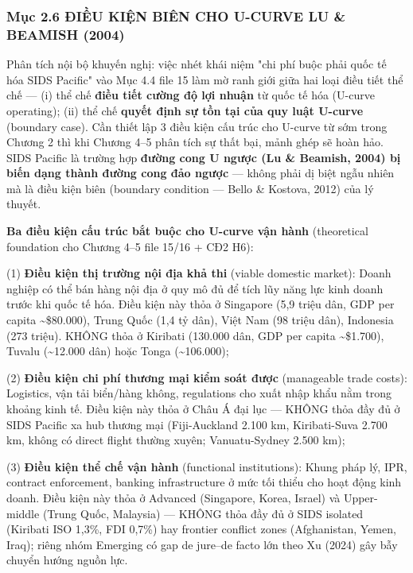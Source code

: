 \documentclass[12pt,a4paper]{article}
\begin{document}
\hypertarget{mux1ee5c-26-ux111iux1ec1u-kiux1ec7n-biuxean-cho-u-curve-lu--beamish-2004}{%
\subsubsection{Mục 2.6 ĐIỀU KIỆN BIÊN CHO U-CURVE LU \& BEAMISH
(2004)}\label{mux1ee5c-26-ux111iux1ec1u-kiux1ec7n-biuxean-cho-u-curve-lu--beamish-2004}}

Phân tích nội bộ khuyến nghị: việc nhét khái niệm "chi phí buộc phải
quốc tế hóa SIDS Pacific" vào Mục 4.4 file 15 làm mờ ranh giới giữa hai
loại điều tiết thể chế --- (i) thể chế \textbf{điều tiết cường độ lợi
nhuận} từ quốc tế hóa (U-curve operating); (ii) thể chế \textbf{quyết
định sự tồn tại của quy luật U-curve} (boundary case). Cần thiết lập 3
điều kiện cấu trúc cho U-curve từ sớm trong Chương 2 thì khi Chương 4--5
phân tích sự thất bại, mảnh ghép sẽ hoàn hảo. SIDS Pacific là trường hợp
\textbf{đường cong U ngược (Lu \& Beamish, 2004) bị biến dạng thành
đường cong đảo ngược} --- không phải dị biệt ngẫu nhiên mà là điều kiện
biên (boundary condition --- Bello \& Kostova, 2012) của lý thuyết.

\textbf{Ba điều kiện cấu trúc bắt buộc cho U-curve vận hành}
(theoretical foundation cho Chương 4--5 file 15/16 + CĐ2 H6):

(1) \textbf{Điều kiện thị trường nội địa khả thi} (viable domestic
market): Doanh nghiệp có thể bán hàng nội địa ở quy mô đủ để tích lũy
năng lực kinh doanh trước khi quốc tế hóa. Điều kiện này thỏa ở
Singapore (5,9 triệu dân, GDP per capita \textasciitilde\$80.000), Trung
Quốc (1,4 tỷ dân), Việt Nam (98 triệu dân), Indonesia (273 triệu). KHÔNG
thỏa ở Kiribati (130.000 dân, GDP per capita \textasciitilde\$1.700),
Tuvalu (\textasciitilde12.000 dân) hoặc Tonga (\textasciitilde106.000);

(2) \textbf{Điều kiện chi phí thương mại kiểm soát được} (manageable
trade costs): Logistics, vận tải biển/hàng không, regulations cho xuất
nhập khẩu nằm trong khoảng kinh tế. Điều kiện này thỏa ở Châu Á đại lục
--- KHÔNG thỏa đầy đủ ở SIDS Pacific xa hub thương mại (Fiji-Auckland
2.100 km, Kiribati-Suva 2.700 km, không có direct flight thường xuyên;
Vanuatu-Sydney 2.500 km);

(3) \textbf{Điều kiện thể chế vận hành} (functional institutions): Khung
pháp lý, IPR, contract enforcement, banking infrastructure ở mức tối
thiểu cho hoạt động kinh doanh. Điều kiện này thỏa ở Advanced
(Singapore, Korea, Israel) và Upper-middle (Trung Quốc, Malaysia) ---
KHÔNG thỏa đầy đủ ở SIDS isolated (Kiribati ISO 1,3\%, FDI 0,7\%) hay
frontier conflict zones (Afghanistan, Yemen, Iraq); riêng nhóm Emerging
có gap de jure--de facto lớn theo Xu (2024) gây bẫy chuyển hướng nguồn
lực.
\end{document}
